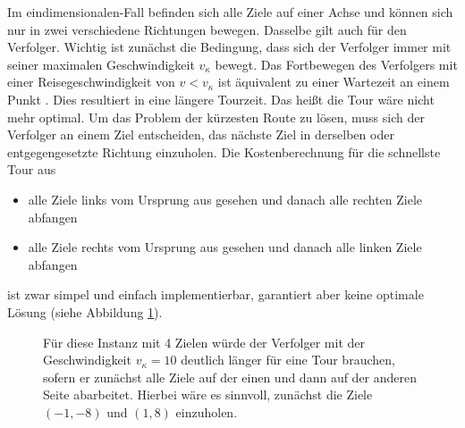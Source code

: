 \documentclass[german,version-2019-11]{uzl-thesis}
\begin{document}
Im eindimensionalen-Fall befinden sich alle Ziele auf einer Achse und können sich nur in zwei verschiedene Richtungen bewegen. Dasselbe gilt auch für den Verfolger. Wichtig ist zunächst die Bedingung, dass sich der Verfolger immer mit seiner maximalen Geschwindigkeit $v_{\kappa}$ bewegt. Das Fortbewegen des Verfolgers mit einer Reisegeschwindigkeit von $v<v_{\kappa}$ ist äquivalent zu einer Wartezeit an einem Punkt  \cite{helvig}. Dies resultiert in eine längere Tourzeit. Das heißt die Tour wäre nicht mehr optimal.
Um das Problem der kürzesten Route zu lösen, muss sich der Verfolger an einem Ziel entscheiden, das nächste Ziel in derselben oder entgegengesetzte Richtung einzuholen. Die Kostenberechnung für die schnellste Tour aus
\begin{itemize}
\item alle Ziele links vom Ursprung aus gesehen und danach alle rechten Ziele abfangen
\item alle Ziele rechts vom Ursprung aus gesehen und danach alle linken Ziele abfangen
\end{itemize} 
ist zwar simpel und einfach implementierbar, garantiert aber keine optimale Lösung (siehe Abbildung \ref{fig:GegenBsp1Dim}).
\begin{figure}[htbp]
\centering
{}
\caption{Für diese Instanz mit 4 Zielen würde der Verfolger mit der Geschwindigkeit $v_{\kappa}=10$ deutlich länger für eine Tour brauchen, sofern er zunächst alle Ziele auf der einen und dann auf der anderen Seite abarbeitet. Hierbei wäre es sinnvoll, zunächst die Ziele $(-1,-8)$ und $(1,8)$ einzuholen.}
\label{fig:GegenBsp1Dim}
\end{figure}
\end{document}
